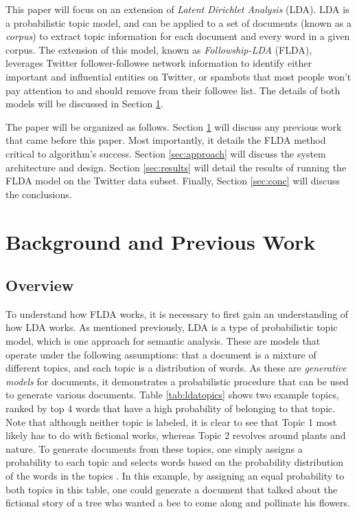\documentclass[a4paper]{article}
\begin{document}
This paper will focus on an extension of \textit{Latent Dirichlet Analysis} (LDA). LDA is a probabilistic topic model, and can be applied to a set of documents (known as a \textit{corpus}) to extract topic information for each document and every word in a given corpus. The extension of this model, known as \textit{Followship-LDA} (FLDA), leverages Twitter follower-followee network information to identify either important and influential entities on Twitter, or spambots that most people won't pay attention to and should remove from their followee list. The details of both models will be discussed in Section \ref{sec:prevwork}.

The paper will be organized as follows. Section \ref{sec:prevwork} will discuss any previous work that came before this paper. Most importantly, it details the FLDA method critical to algorithm's success. Section \ref{sec:approach} will discuss the system architecture and design. Section \ref{sec:results} will detail the results of running the FLDA model on the Twitter data subset. Finally, Section \ref{sec:conc} will discuss the conclusions.



\section{Background and Previous Work}
\label{sec:prevwork}
\subsection{Overview}
To understand how FLDA works, it is necessary to first gain an understanding of how LDA works. As mentioned previously, LDA is a type of probabilistic topic model, which is one approach for semantic analysis. These are models that operate under the following assumptions: that a document is a mixture of different topics, and each topic is a distribution of words. As these are \textit{generative models} for documents, it demonstrates a probabilistic procedure that can be used to generate various documents. Table \ref{tab:ldatopics} shows two example topics, ranked by top 4 words that have a high probability of belonging to that topic. Note that although neither topic is labeled, it is clear to see that Topic 1 most likely has to do with fictional works, whereas Topic 2 revolves around plants and nature. To generate documents from these topics, one simply assigns a probability to each topic and selects words based on the probability distribution of the words in the topics \cite{lda}. In this example, by assigning an equal probability to both topics in this table, one could generate a document that talked about the fictional story of a tree who wanted a bee to come along and pollinate his flowers.
\end{document}
